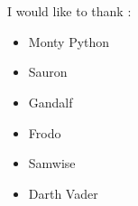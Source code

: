 \section*{\ackname}

I would like to thank : 

\begin{itemize}
\item Monty Python
\item Sauron
\item Gandalf
\item Frodo
\item Samwise
\item Darth Vader
\end{itemize}